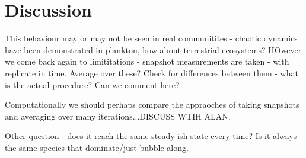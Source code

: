 \newpage

\section{Discussion}

This behaviour may or may not be seen in real communitites - chaotic dynamics have been demonstrated in plankton, how about terrestrial ecosystems? HOwever we come back again to limititations - snapshot measurements are taken - with replicate in time. Average over these? Check for differences between them - what is the actual procedure? Can we comment here? 

Computationally we should perhaps compare the appraoches of taking snapshots and averaging over many iterations...DISCUSS WTIH ALAN.

Other question - does it reach the same steady-ish state every time? Is it always the same species that dominate/just bubble along.


